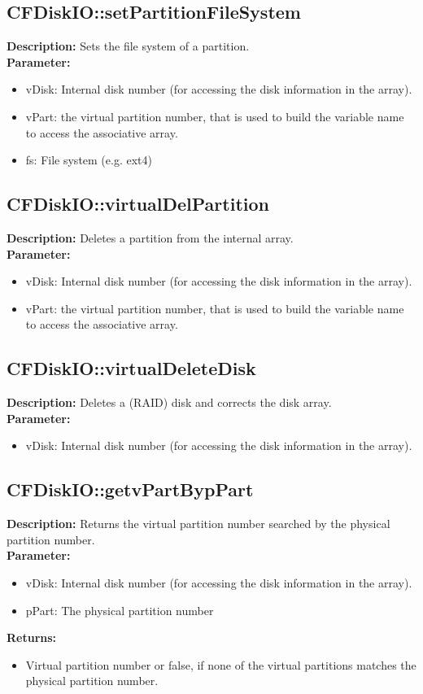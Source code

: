 \subsection{CFDiskIO::setPartitionFileSystem}
\textbf{Description:} Sets the file system of a partition.\\
\textbf{Parameter:}
\begin{itemize}
\item vDisk: Internal disk number (for accessing the disk information in the array).
\item vPart: the virtual partition number, that is used to build the variable name to access the associative array.
\item fs: File system (e.g. ext4)
\end{itemize}

\subsection{CFDiskIO::virtualDelPartition}
\textbf{Description:} Deletes a partition from the internal array.\\
\textbf{Parameter:}
\begin{itemize}
\item vDisk: Internal disk number (for accessing the disk information in the array).
\item vPart: the virtual partition number, that is used to build the variable name to access the associative array.
\end{itemize}

\subsection{CFDiskIO::virtualDeleteDisk}
\textbf{Description:} Deletes a (RAID) disk and corrects the disk array.\\
\textbf{Parameter:}
\begin{itemize}
\item vDisk: Internal disk number (for accessing the disk information in the array).
\end{itemize}

\subsection{CFDiskIO::getvPartBypPart}
\textbf{Description:} Returns the virtual partition number searched by the physical partition number.\\
\textbf{Parameter:}
\begin{itemize}
\item vDisk: Internal disk number (for accessing the disk information in the array).
\item pPart: The physical partition number
\end{itemize}
\textbf{Returns:}
\begin{itemize}
\item Virtual partition number or false, if none of the virtual partitions matches the physical partition number.
\end{itemize}

